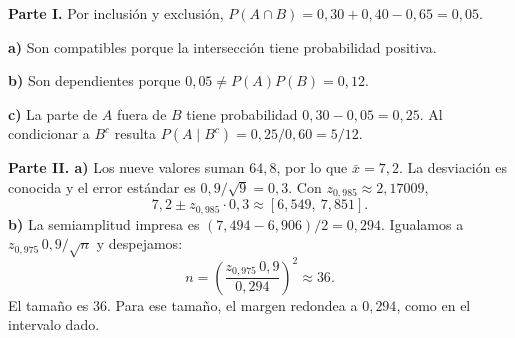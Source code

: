 \textbf{Parte I.} Por inclusión y exclusión, $P(A\cap B)=0{,}30+0{,}40-0{,}65=0{,}05$.

\textbf{a)} Son compatibles porque la intersección tiene probabilidad positiva.

\textbf{b)} Son dependientes porque $0{,}05\ne P(A)P(B)=0{,}12$.

\textbf{c)} La parte de $A$ fuera de $B$ tiene probabilidad $0{,}30-0{,}05=0{,}25$. Al condicionar a $B^c$ resulta $P(A\mid B^c)=0{,}25/0{,}60=\boxed{5/12}$.

\textbf{Parte II. a)} Los nueve valores suman $64{,}8$, por lo que $\bar x=7{,}2$. La desviación es conocida y el error estándar es $0{,}9/\sqrt9=0{,}3$. Con $z_{0{,}985}\approx2{,}17009$,
\[
7{,}2\pm z_{0{,}985}\cdot0{,}3
\approx\boxed{[6{,}549,\ 7{,}851]}.
\]
\textbf{b)} La semiamplitud impresa es $(7{,}494-6{,}906)/2=0{,}294$. Igualamos a $z_{0{,}975}\,0{,}9/\sqrt n$ y despejamos:
\[
n=\left(\frac{z_{0{,}975}\,0{,}9}{0{,}294}\right)^2\approx36.
\]
El tamaño es $\boxed{36}$. Para ese tamaño, el margen redondea a $0{,}294$, como en el intervalo dado.
